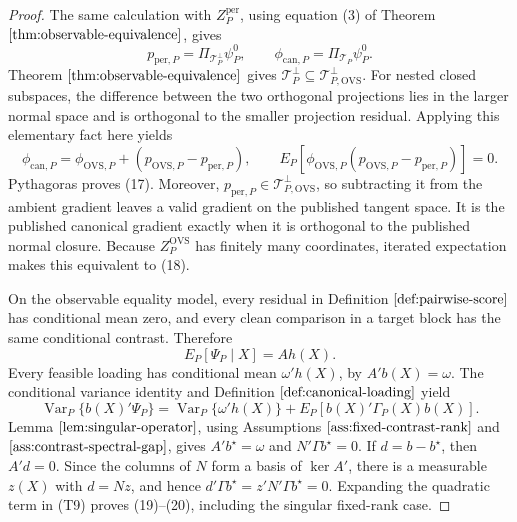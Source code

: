 \documentclass{article}
\begin{document}
\begin{proof}
The same calculation with \(Z_P^{\mathrm{per}}\), using equation (3) of Theorem \(\ref{thm:observable-equivalence}\), gives
\[
p_{\mathrm{per},P}=\Pi_{\mathcal T_P^\perp}\psi_P^0,
\qquad
\phi_{\mathrm{can},P}=\Pi_{\mathcal T_P}\psi_P^0.
\tag{T7}
\]
Theorem \(\ref{thm:observable-equivalence}\) gives \(\mathcal T_P^\perp\subseteq\mathcal T_{P,\mathrm{OVS}}^\perp\).  For nested closed subspaces, the difference between the two orthogonal projections lies in the larger normal space and is orthogonal to the smaller projection residual.  Applying this elementary fact here yields
\[
\phi_{\mathrm{can},P}
=\phi_{\mathrm{OVS},P}+(p_{\mathrm{OVS},P}-p_{\mathrm{per},P}),
\qquad
E_P[\phi_{\mathrm{OVS},P}(p_{\mathrm{OVS},P}-p_{\mathrm{per},P})]=0.
\]
Pythagoras proves (17).  Moreover, \(p_{\mathrm{per},P}\in\mathcal T_{P,\mathrm{OVS}}^\perp\), so subtracting it from the ambient gradient leaves a valid gradient on the published tangent space.  It is the published canonical gradient exactly when it is orthogonal to the published normal closure.  Because \(Z_P^{\mathrm{OVS}}\) has finitely many coordinates, iterated expectation makes this equivalent to (18).

On the observable equality model, every residual in Definition \(\ref{def:pairwise-score}\) has conditional mean zero, and every clean comparison in a target block has the same conditional contrast.  Therefore
\[
E_P[\Psi_P\mid X]=Ah(X).
\tag{T8}
\]
Every feasible loading has conditional mean \(\omega'h(X)\), by \(A'b(X)=\omega\).  The conditional variance identity and Definition \(\ref{def:canonical-loading}\) yield
\[
\operatorname{Var}_P\{b(X)'\Psi_P\}
=\operatorname{Var}_P\{\omega'h(X)\}
+E_P[b(X)'\Gamma_P(X)b(X)].
\tag{T9}
\]
Lemma \(\ref{lem:singular-operator}\), using Assumptions \(\ref{ass:fixed-contrast-rank}\) and \(\ref{ass:contrast-spectral-gap}\), gives \(A'b^\star=\omega\) and \(N'\Gamma b^\star=0\).  If \(d=b-b^\star\), then \(A'd=0\).  Since the columns of \(N\) form a basis of \(\ker A'\), there is a measurable \(z(X)\) with \(d=Nz\), and hence \(d'\Gamma b^\star=z'N'\Gamma b^\star=0\).  Expanding the quadratic term in (T9) proves (19)--(20), including the singular fixed-rank case.


\end{proof}
\end{document}
